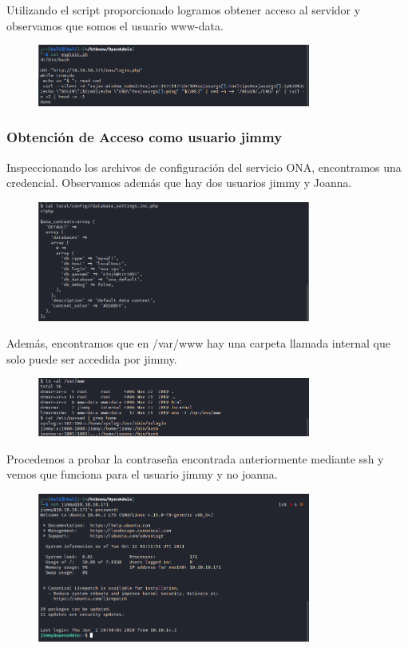 \documentclass{article}
\begin{document}
Utilizando el script proporcionado logramos obtener acceso al servidor y observamos que somos el usuario www-data.
\begin{figure}[H]
	\center
	\includegraphics[width=0.8\textwidth]{images/openadmin/7-script.png}
	\caption{}
\end{figure}

\subsubsection{Obtención de Acceso como usuario jimmy}

Inspeccionando los archivos de configuración del servicio ONA, encontramos una credencial. Observamos además que hay dos usuarios jimmy y Joanna.
\begin{figure}[H]
	\center
	\includegraphics[width=0.8\textwidth]{images/openadmin/8-credencialesjimmy.png}
	\caption{}
\end{figure}

Además, encontramos que en /var/www hay una carpeta llamada internal que solo puede ser accedida por jimmy.
\begin{figure}[H]
	\center
	\includegraphics[width=0.8\textwidth]{images/openadmin/9-usuariosycarpetas.png}
	\caption{}
\end{figure}

Procedemos a probar la contraseña encontrada anteriormente mediante ssh y vemos que funciona para el usuario jimmy y no joanna.
\begin{figure}[H]
	\center
	\includegraphics[width=0.8\textwidth]{images/openadmin/10-sshjimmy.png}
	\caption{}
\end{figure}
\end{document}
